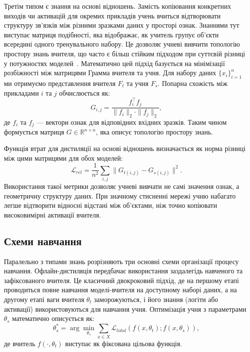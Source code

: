 \documentclass{pma-mthesis}
\begin{document}
Третім типом є знання на основі відношень. Замість копіювання конкретних виходів чи активацій для окремих прикладів учень вчиться відтворювати структуру зв'язків між різними зразками даних у просторі ознак. Знаннями тут виступає матриця подібності, яка відображає, як учитель групує об'єкти всередині одного тренувального набору. Це дозволяє учневі вивчити топологію простору знань вчителя, що часто є більш стійким підходом при суттєвій різниці у потужностях моделей~\cite{park2019relational}. Математично цей підхід базується на мінімізації розбіжності між матрицями Грамма вчителя та учня. Для набору даних $\{x_i\}_{i=1}^n$ ми отримуємо представлення вчителя $F_t$ та учня $F_s$. Попарна схожість між прикладами $i$ та $j$ обчислюється як:
\begin{equation}
    G_{i,j} = \frac{f_i^\top f_j}{\|f_i\|_2 \cdot \|f_j\|_2},
\end{equation}
де $f_i$ та $f_j$ --- вектори ознак для відповідних вхідних зразків. Таким чином формується матриця $G \in \mathbb{R}^{n \times n}$, яка описує топологію простору знань.

Функція втрат для дистиляції на основі відношень визначається як норма різниці між цими матрицями для обох моделей:
\begin{equation}
    \mathcal{L}_{rel} = \frac{1}{n^2} \sum_{i,j} \| G_{t(i,j)} - G_{s(i,j)} \|^2.
\end{equation}
Використання такої метрики дозволяє учневі вивчати не самі значення ознак, а геометричну структуру даних. При значному стисненні мережі учню набагато легше відтворити відносні відстані між об'єктами, ніж точно копіювати високовимірні активації вчителя.

\subsection{Схеми навчання}

Паралельно з типами знань розрізняють три основні схеми організації процесу навчання. Офлайн-дистиляція передбачає використання заздалегідь навченого та зафіксованого вчителя. Це класичний двокроковий підхід, де на першому етапі проводиться повне навчання моделі-вчителя на доступному наборі даних, а на другому етапі ваги вчителя $\theta_t$ заморожуються, і його знання (логіти або активації) використовуються для навчання учня. Оптимізація учня з параметрами $\theta_s$ математично описується як:
\begin{equation}
    \theta_s^* = \arg \min_{\theta_s} \sum_{x \in X} \mathcal{L}_{total}(f(x, \theta_t); f(x, \theta_s)),
\end{equation}
де вчитель $f(\cdot, \theta_t)$ виступає як фіксована цільова функція.
\end{document}
